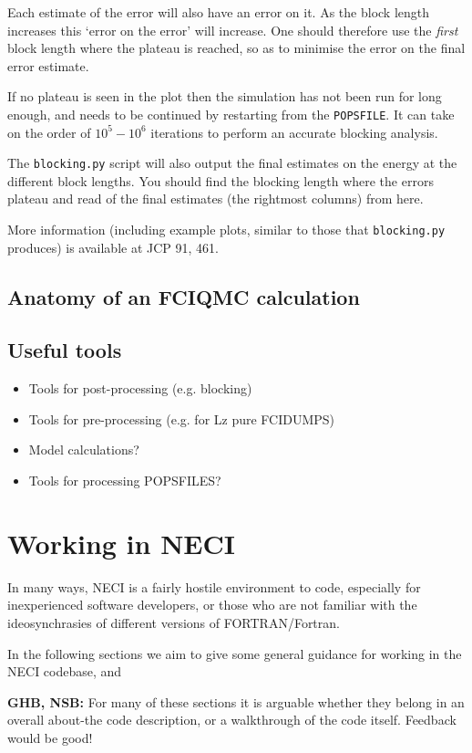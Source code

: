 \documentclass[a4paper,notitlepage]{scrreprt}
\let\code\lstinline
\begin{document}
    Each estimate of the error will also have an error on it. As the block
    length increases this `error on the error' will increase. One should
    therefore use the \emph{first} block length where the plateau is reached,
    so as to minimise the error on the final error estimate.

    If no plateau is seen in the plot then the simulation has not been run for
	long enough, and needs to be continued by restarting from the \code{POPSFILE}.
    It can take on the order of $10^5-10^6$ iterations to perform an accurate
    blocking analysis.

	The \code{blocking.py} script will also output the final estimates on the energy
    at the different block lengths. You should find the blocking length where
    the errors plateau and read of the final estimates (the rightmost columns)
    from here.

	More information (including example plots, similar to those that
	\code{blocking.py} produces) is available at JCP 91, 461.

\section{Anatomy of an FCIQMC calculation}
\section{Useful tools}
\begin{itemize}
	\item Tools for post-processing (e.g. blocking)
	\item Tools for pre-processing (e.g. for Lz pure FCIDUMPS)
	\item Model calculations?
	\item Tools for processing POPSFILES?
\end{itemize}


\chapter{Working in NECI}
In many ways, NECI is a fairly hostile environment to code, especially for
inexperienced software developers, or those who are not familiar with the
ideosynchrasies of different versions of FORTRAN/Fortran.

In the following sections we aim to give some general guidance for working in
the NECI codebase, and

\textbf{GHB, NSB:} For many of these sections it is arguable whether they
belong in an overall about-the code description, or a walkthrough of the code
itself. Feedback would be good!
\end{document}
